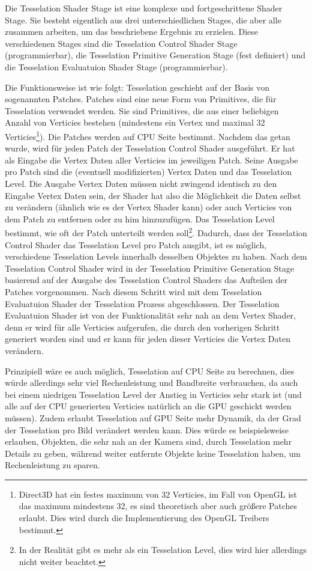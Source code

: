 Die Tesselation Shader Stage ist eine komplexe und fortgeschrittene Shader Stage. Sie besteht eigentlich aus drei unterschiedlichen Stages, die aber alle zusammen arbeiten, um das beschriebene Ergebnis zu erzielen. Diese verschiedenen Stages sind die Tesselation Control Shader Stage (programmierbar), die Tesselation Primitive Generation Stage (fest definiert) und die Tesselation Evaluatuion Shader Stage (programmierbar). 

Die Funktionsweise ist wie folgt: Tesselation geschieht auf der Basis von sogenannten Patches. Patches sind eine neue Form von Primitives, die für Tesselation verwendet werden. Sie sind Primitives, die aus einer beliebigen Anzahl von Verticies bestehen (mindestens ein Vertex und maximal 32 Verticies\footnote{Direct3D hat ein festes maximum von 32 Verticies, im Fall von OpenGL ist das maximum mindestens 32, es sind theoretisch aber auch größere Patches erlaubt. Dies wird durch die Implementierung des OpenGL Treibers bestimmt.}). Die Patches werden auf CPU Seite bestimmt. Nachdem das getan wurde, wird für jeden Patch der Tesselation Control Shader ausgeführt. Er hat als Eingabe die Vertex Daten aller Verticies im jeweiligen Patch. Seine Ausgabe pro Patch sind die (eventuell modifizierten) Vertex Daten und das Tesselation Level. Die Ausgabe Vertex Daten müssen nicht zwingend identisch zu den Eingabe Vertex Daten sein, der Shader hat also die Möglichkeit die Daten selbst zu verändern (ähnlich wie es der Vertex Shader kann) oder auch Verticies von dem Patch zu entfernen oder zu him hinzuzufügen. Das Tesselation Level bestimmt, wie oft der Patch unterteilt werden soll\footnote{In der Realität gibt es mehr als ein Tesselation Level, dies wird hier allerdings nicht weiter beachtet.}. Dadurch, dass der Tesselation Control Shader das Tesselation Level pro Patch ausgibt, ist es möglich, verschiedene Tesselation Levels innerhalb desselben Objektes zu haben. Nach dem Tesselation Control Shader wird in der Tesselation Primitive Generation Stage basierend auf der Ausgabe des Tesselation Control Shaders das Aufteilen der Patches vorgenommen. Nach diesem Schritt wird mit dem Tesselation Evaluatuion Shader der Tesselation Prozess abgeschlossen. Der Tesselation Evaluatuion Shader ist von der Funktionalität sehr nah an dem Vertex Shader, denn er wird für alle Verticies aufgerufen, die durch den vorherigen Schritt generiert worden sind und er kann für jeden dieser Verticies die Vertex Daten verändern. 

Prinzipiell wäre es auch möglich, Tesselation auf CPU Seite zu berechnen, dies würde allerdings sehr viel Rechenleistung und Bandbreite verbrauchen, da auch bei einem niedrigen Tesselation Level der Anstieg in Verticies sehr stark ist (und alle auf der CPU generierten Verticies natürlich an die GPU geschickt werden müssen). Zudem erlaubt Tesselation auf GPU Seite mehr Dynamik, da der Grad der Tesselation pro Bild verändert werden kann. Dies würde es beispielsweise erlauben, Objekten, die sehr nah an der Kamera sind, durch Tesselation mehr Details zu geben, während weiter entfernte Objekte keine Tesselation haben, um Rechenleistung zu sparen.

